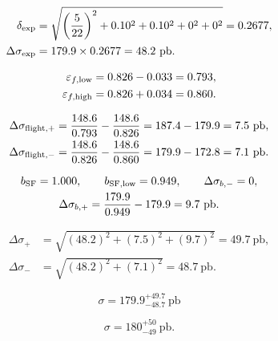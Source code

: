 \documentclass[10pt]{article}
\newcommand{\pb}{\mathrm{pb}}
\begin{document}
\begin{center}
\begin{minipage}[t]{0.49\textwidth}
\[
\begin{aligned}
\delta_{\rm exp}
&=\sqrt{\left(\frac{5}{22}\right)^2+0.10^2+0.10^2+0^2+0^2}
  =0.2677,\\
\Delta\sigma_{\rm exp}
&=179.9\times0.2677=48.2~\pb .
\end{aligned}
\]

\[
\begin{aligned}
\varepsilon_{f,\rm low}&=0.826-0.033=0.793,\\
\varepsilon_{f,\rm high}&=0.826+0.034=0.860 .
\end{aligned}
\]

\[
\begin{aligned}
\Delta\sigma_{\rm flight,+}
&=\frac{148.6}{0.793}-\frac{148.6}{0.826}
 =187.4-179.9=7.5~\pb,\\
\Delta\sigma_{\rm flight,-}
&=\frac{148.6}{0.826}-\frac{148.6}{0.860}
 =179.9-172.8=7.1~\pb .
\end{aligned}
\]

\[
\begin{gathered}
b_{\rm SF}=1.000,\qquad
b_{\rm SF,low}=0.949,\qquad
\Delta\sigma_{b,-}=0,\\
\Delta\sigma_{b,+}
=\frac{179.9}{0.949}-179.9=9.7~\pb .
\end{gathered}
\]

\[
\begin{aligned}
\Delta\sigma_{+}
&=\sqrt{(48.2)^2+(7.5)^2+(9.7)^2}
 =49.7~\pb,\\
\Delta\sigma_{-}
&=\sqrt{(48.2)^2+(7.1)^2}
 =48.7~\pb .
\end{aligned}
\]

\[
\boxed{
\sigma
=
179.9^{+49.7}_{-48.7}~\pb
}
\]

\[
\boxed{
\sigma
=
180^{+50}_{-49}~\pb
}.
\]

\end{minipage}
\end{center}
\end{document}
